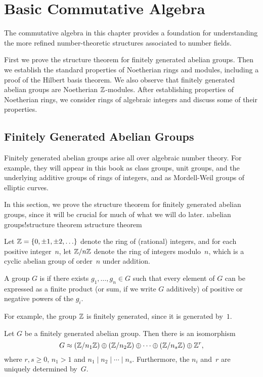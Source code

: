 \chapter{Basic Commutative Algebra}

The commutative algebra in this chapter provides a
foundation for understanding the more refined number-theoretic
structures associated to number fields.

First we prove the structure theorem for finitely generated abelian
groups.  Then we establish the standard properties of Noetherian rings
and modules, including a proof of the Hilbert basis theorem.  We also
observe that finitely generated abelian groups are Noetherian
$\mathbb{Z}$-modules.  After establishing
properties of Noetherian rings, we consider rings of algebraic
integers and discuss some of their properties.

\section{Finitely Generated Abelian Groups}\label{sec:fg}
Finitely generated abelian groups arise all over algebraic number
theory.  For example, they will appear in this book as class groups,
unit groups, and the underlying additive groups of rings of integers,
and as Mordell-Weil groups of elliptic curves.

In this section, we prove the structure theorem for finitely generated
abelian groups, since it will be crucial for much of what we will do
later. \i{abelian groups!structure theorem} \i{structure theorem}

Let $\mathbb{Z}=\{0,\pm 1, \pm 2, \ldots\}$ denote the ring of (rational)
integers, and for each positive integer~$n$, let $\mathbb{Z}/n\mathbb{Z}$ denote the
ring of integers modulo~$n$, which is a cyclic abelian group of
order~$n$ under addition.

\begin{definition}
	A group $G$ is  if there exists
	$g_1,\ldots, g_n \in G$ such that every element of $G$ can be
	expressed as a finite product (or sum, if we write $G$ additively)
	of positive or negative powers of the $g_i$.
\end{definition}
For example, the group $\mathbb{Z}$ is finitely generated, since it is generated
by~$1$.

\begin{theorem}
	\label{thm:struc}
	Let $G$ be a finitely generated abelian group. Then there is an isomorphism
	$$
		G \approx (\mathbb{Z}/n_1\mathbb{Z}) \oplus (\mathbb{Z}/n_2\mathbb{Z}) \oplus
		\cdots \oplus (\mathbb{Z}/n_s\mathbb{Z}) \oplus \mathbb{Z}^{r},
	$$
	where $r, s\geq 0$, $n_1>1$ and $n_1\mid{}n_2\mid{}\cdots \mid{}n_s$.
	Furthermore, the $n_i$ and~$r$ are uniquely determined by~$G$.
\end{theorem}

